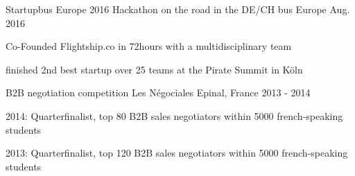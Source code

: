 

\begin{cventries}

  \cventry
    {Startupbus Europe 2016} %
    {Hackathon on the road in the DE/CH bus} %
    {Europe} %
    {Aug. 2016} %
    {
      \begin{cvitems} %
        \item {Co-Founded Flightship.co in 72hours with a multidisciplinary team}
        \item {finished 2nd best startup over 25 teams at the Pirate Summit in Köln}
      \end{cvitems}
    }

  \cventry
    {B2B negotiation competition} %
    {Les Négociales} %
    {Epinal, France} %
    {2013 - 2014} %
    {
    	\begin{cvitems}
    	\item{2014: Quarterfinalist, top 80 B2B sales negotiators within 5000 french-speaking students}
    	\item{2013: Quarterfinalist, top 120 B2B sales negotiators within 5000 french-speaking students}
    	\end{cvitems}
    }
\end{cventries}

